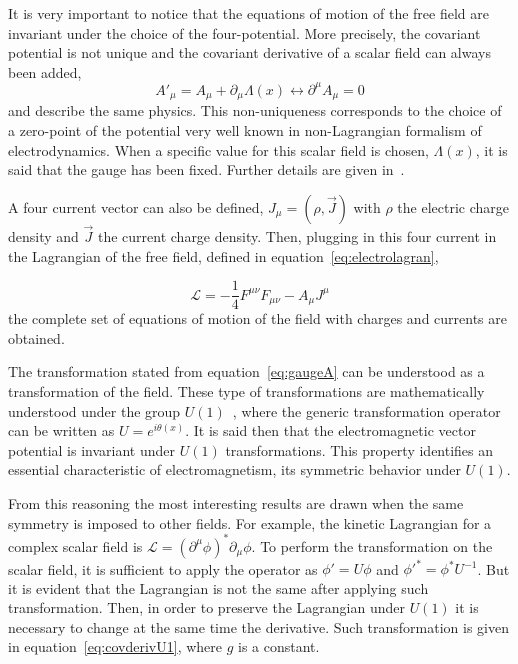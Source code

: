 It is very important to notice that the equations of motion of the free field are invariant under the choice of the four-potential. More precisely, the covariant potential is not unique and the covariant derivative of a scalar field can always been added, 
\begin{equation}
  \label{eq:gaugeA}
  {A'}_{\mu}=A_{\mu}+\partial_{\mu}\Lambda(x) \leftrightarrow \partial^{\mu}A_{\mu}=0
\end{equation} and describe the same physics. This non-uniqueness corresponds to the choice of a zero-point of the potential very well known in non-Lagrangian formalism of electrodynamics. When a specific value for this scalar field is chosen, $\Lambda(x)$, it is said that the gauge has been fixed. Further details are given in~\cite{Griffiths:2008zz}.

A four current vector can also be defined, $J_{\mu}=\left( \rho,\vec{J} \right)$ with $\rho$ the electric charge density and $\vec{J}$ the current charge density. Then, plugging in this four current in the Lagrangian of the free field, defined in equation~\ref{eq:electrolagran}, 

\begin{equation}
  \label{eq:fulleleclagrangian}
  \mathcal{L}=-\frac{1}{4}F^{\mu\nu}F_{\mu\nu}-A_{\mu}J^{\mu}
\end{equation}the complete set of equations of motion of the field with charges and currents are obtained.

The transformation stated from equation~\ref{eq:gaugeA} can be understood as a transformation of the field. These type of transformations are mathematically understood under the group $U(1)$~\cite{Georgi:1999wka}, where the generic transformation operator can be written as $U=e^{i\theta(x)}$. It is said then that the electromagnetic vector potential is invariant under $U(1)$ transformations. This property identifies an essential characteristic of electromagnetism, its symmetric behavior under $U(1)$. 

From this reasoning the most interesting results are drawn when the same symmetry is imposed to other fields. For example, the kinetic Lagrangian for a complex scalar field is $\mathcal{L}=(\partial^{\mu}\phi)^{*}\partial_{\mu}\phi$. To perform the transformation on the scalar field, it is sufficient to apply the operator as $\phi'=U\phi$ and ${\phi'}^{*}={\phi}^{*} U^{-1}$. But it is evident that the Lagrangian is not the same after applying such transformation. Then, in order to preserve the Lagrangian under $U(1)$ it is necessary to change at the same time the derivative. Such transformation is given in equation~\ref{eq:covderivU1}, where $g$ is a constant.

